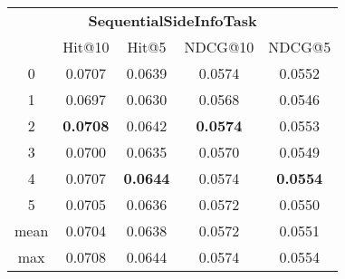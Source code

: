 \documentclass{article}
\begin{document}
 

\begin{tabular}{c|cccc}

\multicolumn{5}{c}{\textbf{SequentialSideInfoTask}} \\
\noalign{\smallskip}
\noalign{\smallskip}
\toprule
\multicolumn{1}{c}{Template ID} & \multicolumn{1}{|c}{Hit@10} & \multicolumn{1}{c}{Hit@5} & \multicolumn{1}{c}{NDCG@10} & \multicolumn{1}{c}{NDCG@5} \\
\midrule
0 & 0.0707 & 0.0639 & 0.0574 & 0.0552 \\
1 & 0.0697 & 0.0630 & 0.0568 & 0.0546 \\
2 & \textbf{0.0708} & 0.0642 & \textbf{0.0574} & 0.0553 \\
3 & 0.0700 & 0.0635 & 0.0570 & 0.0549 \\
4 & 0.0707 & \textbf{0.0644} & 0.0574 & \textbf{0.0554} \\
5 & 0.0705 & 0.0636 & 0.0572 & 0.0550 \\
\midrule
mean & 0.0704 & 0.0638 & 0.0572 & 0.0551 \\
max & 0.0708 & 0.0644 & 0.0574 & 0.0554 \\
\bottomrule

\end{tabular}
\end{document}
